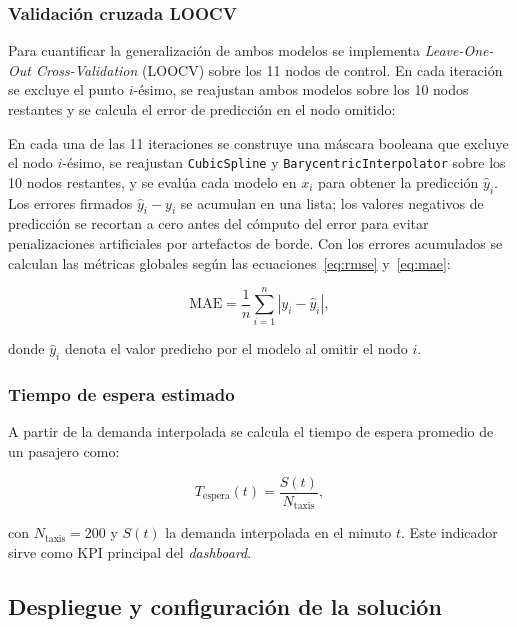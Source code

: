 \documentclass[conference]{IEEEtran}
\begin{document}
\subsubsection{Validación cruzada LOOCV}

Para cuantificar la generalización de ambos modelos se implementa
\textit{Leave-One-Out Cross-Validation} (LOOCV) sobre los 11 nodos
de control. En cada iteración se excluye el punto $i$-ésimo,
se reajustan ambos modelos sobre los 10 nodos restantes y se
calcula el error de predicción en el nodo omitido:

En cada una de las 11 iteraciones se construye una máscara booleana que excluye el nodo $i$-ésimo, se reajustan \texttt{CubicSpline} y
\texttt{BarycentricInterpolator} sobre los 10 nodos restantes, y se evalúa cada modelo en $x_i$ para obtener la predicción $\hat{y}_i$. Los errores
firmados $\hat{y}_i - y_i$ se acumulan en una lista; los valores negativos de predicción se recortan a cero antes del cómputo del error para evitar
penalizaciones artificiales por artefactos de borde. Con los errores acumulados se calculan las métricas globales según las ecuaciones~\eqref{eq:rmse}
y~\eqref{eq:mae}:

\begin{equation}
\mathrm{MAE} = \frac{1}{n}\sum_{i=1}^{n} |y_i - \hat{y}_i|,
\label{eq:mae}
\end{equation}

\noindent donde $\hat{y}_i$ denota el valor predicho por el modelo
al omitir el nodo $i$.

\subsubsection{Tiempo de espera estimado}

A partir de la demanda interpolada se calcula el tiempo de espera promedio de un pasajero como:

\begin{equation}
T_{\text{espera}}(t) = \frac{S(t)}{N_{\text{taxis}}},
\label{eq:t_espera}
\end{equation}

\noindent con $N_{\text{taxis}} = 200$ y $S(t)$ la demanda interpolada en el minuto $t$. Este indicador sirve como KPI principal del \textit{dashboard}.

\subsection{Despliegue y configuración de la solución}
\end{document}
